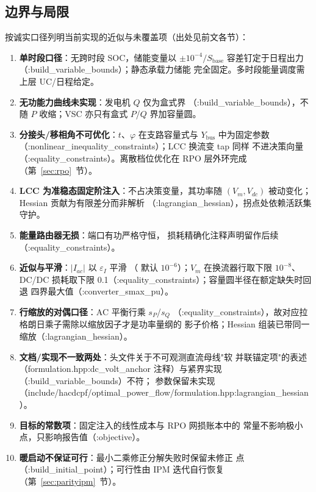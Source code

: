 \subsection{边界与局限}

按诚实口径列明当前实现的近似与未覆盖项（出处见前文各节）：

\begin{enumerate}
\item \textbf{单时段口径}：无跨时段 SOC，储能变量以 $\pm10^{-4}/
  S_{\mathrm{base}}$ 容差钉定于日程出力（:build\_variable\_bounds）；静态承载力储能
  完全固定。多时段能量调度需上层 UC/日程给定。
\item \textbf{无功能力曲线未实现}：发电机 $Q$ 仅为盒式界
  （:build\_variable\_bounds），不随 $P$ 收缩；VSC 亦只有盒式 $P$/$Q$ 界加容量圆。
\item \textbf{分接头/移相角不可优化}：$t$、$\varphi$ 在支路容量式与
  $Y_{\mathrm{bus}}$ 中为固定参数（:nonlinear\_inequality\_constraints）；LCC 换流变 tap 同样
  不进决策向量（:equality\_constraints）。离散档位优化在 RPO 层外环完成
  （第~\ref{sec:rpo}~节）。
\item \textbf{LCC 为准稳态固定阶注入}：不占决策变量，其功率随
  $(V_m,V_{dc})$ 被动变化；Hessian 贡献为有限差分而非解析
  （:lagrangian\_hessian），拐点处依赖活跃集守护。
\item \textbf{能量路由器无损}：端口有功严格守恒，
  损耗精确化注释声明留作后续（:equality\_constraints）。
\item \textbf{近似与平滑}：$|I_{ac}|$ 以 $\varepsilon_I$ 平滑
  （ 默认 $10^{-6}$）；$V_m$ 在换流器行取下限 $10^{-8}$、
  DC/DC 损耗取下限 0.1（:equality\_constraints）；容量圆半径在额定缺失时回退
  四界最大值（:converter\_smax\_pu）。
\item \textbf{行缩放的对偶口径}：AC 平衡行乘 $s_P$/$s_Q$
  （:equality\_constraints），故对应拉格朗日乘子需除以缩放因子才是功率量纲的
  影子价格；Hessian 组装已带同一缩放（:lagrangian\_hessian）。
\item \textbf{文档/实现不一致两处}：头文件关于不可观测直流母线"软
  并联锚定项"的表述（formulation.hpp\allowbreak :dc\_volt\_anchor 注释）与紧界实现
  （:build\_variable\_bounds）不符； 参数保留未实现
  （include/hacdcpf/optimal\_power\_flow/formulation.hpp:lagrangian\_hessian）。
\item \textbf{目标的常数项}：固定注入的线性成本与 RPO 网损账本中的
  常量不影响极小点，只影响报告值（:objective）。
\item \textbf{暖启动不保证可行}：最小二乘修正分解失败时保留未修正
  点（:build\_initial\_point）；可行性由 IPM 迭代自行恢复
  （第~\ref{sec:parityipm}~节）。
\end{enumerate}
